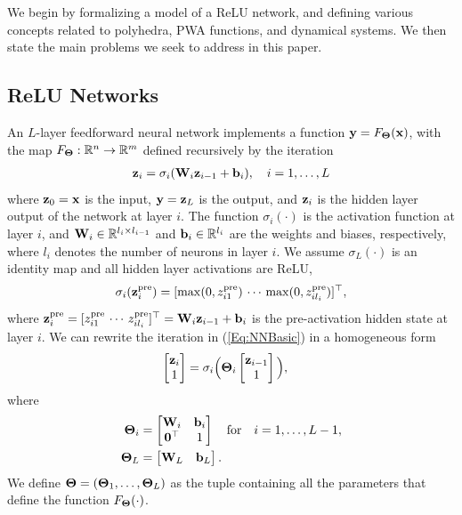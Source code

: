 We begin by formalizing a model of a ReLU network, and defining various concepts related to polyhedra, PWA functions, and dynamical systems.
We then state the main problems we seek to address in this paper.
\subsection{ReLU Networks} \label{sec:relu_networks}
An $L$-layer feedforward neural network implements a function $\mathbf{y} = F_{\mathbf{\Theta}}(\mathbf{x})$, with the map $F_{\mathbf{\Theta}}: \mathbb{R}^{n} \rightarrow \mathbb{R}^{m}$ defined recursively by the iteration
\begin{align}
\label{Eq:NNBasic}
    \mathbf{z}_{i} = \sigma_i(\mathbf{W}_i \mathbf{z}_{i-1} + \mathbf{b}_i), \quad i = 1, \ldots, L
\end{align}
where $\mathbf{z}_0 = \mathbf{x}$ is the input, $\mathbf{y} = \mathbf{z}_L$ is the output, and $\mathbf{z}_i$ is the hidden layer output of the network at layer $i$.  The function $\sigma_i(\cdot)$ is the activation function at layer $i$, and $\mathbf{W}_i\in\mathbb{R}^{l_i \times l_{i-1}}$ and $\mathbf{b}_i\in\mathbb{R}^{l_i}$ are the weights and biases, respectively, where $l_i$ denotes the number of neurons in layer $i$. We assume $\sigma_{L}(\cdot)$ is an identity map and all hidden layer activations are ReLU,
\begin{align}
\label{Eq:ReLU}
    \sigma_i(\mathbf{z}^\text{pre}_{i}) = [\max(0,z^\text{pre}_{i1}) \, \cdots \, \max(0,z^\text{pre}_{i l_i})]^\top,
\end{align}
where $\mathbf{z}^\text{pre}_i = [z^\text{pre}_{i1} \, \cdots \, z^\text{pre}_{i l_i}]^\top = \mathbf{W}_i\mathbf{z}_{i-1} + \mathbf{b}_i$ is the pre-activation hidden state at layer $i$. We can rewrite the iteration in (\ref{Eq:NNBasic}) in a homogeneous form
\begin{align}
\label{Eq:NNHomogeneous}
        \begin{bmatrix}
            \mathbf{z}_i \\ 
            1
        \end{bmatrix}
            &= \sigma_i\Big(\mathbf{\Theta}_i \begin{bmatrix}
            \mathbf{z}_{i-1} \\ 
            1
        \end{bmatrix}\Big),
\end{align}
where
\begin{subequations}
\begin{align}
\mathbf{\Theta}_i &= 
        \begin{bmatrix}
            \mathbf{W}_i & \mathbf{b}_i \\
            \mathbf{0}^\top & 1
        \end{bmatrix} \quad \text{for} \quad i = 1, \ldots, L-1, \label{Eq:ThetaDef} \\
\mathbf{\Theta}_L &= 
    \begin{bmatrix}
        \mathbf{W}_L & \mathbf{b}_L
    \end{bmatrix}. \label{Eq:ThetaLDef}
\end{align}
\end{subequations}
We define $\mathbf{\Theta} = (\mathbf{\Theta}_1, \ldots, \mathbf{\Theta}_L)$ as the tuple containing all the parameters that define the function $F_{\mathbf{\Theta}}(\cdot)$. 

